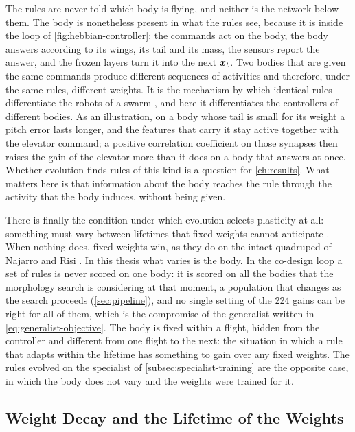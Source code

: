 The rules are never told which body is flying, and neither is the network below them. The body is nonetheless present in what the rules see, because it is inside the loop of \autoref{fig:hebbian-controller}: the commands act on the body, the body answers according to its wings, its tail and its mass, the sensors report the answer, and the frozen layers turn it into the next $\bm{x}_t$. Two bodies that are given the same commands produce different sequences of activities and therefore, under the same rules, different weights. It is the mechanism by which identical rules differentiate the robots of a swarm \cite{vandiggelen2025emergent}, and here it differentiates the controllers of different bodies. As an illustration, on a body whose tail is small for its weight a pitch error lasts longer, and the features that carry it stay active together with the elevator command; a positive correlation coefficient on those synapses then raises the gain of the elevator more than it does on a body that answers at once. Whether evolution finds rules of this kind is a question for \autoref{ch:results}. What matters here is that information about the body reaches the rule through the activity that the body induces, without being given.

There is finally the condition under which evolution selects plasticity at all: something must vary between lifetimes that fixed weights cannot anticipate \cite{soltoggio2018born}. When nothing does, fixed weights win, as they do on the intact quadruped of Najarro and Risi \cite{najarro2020meta}. In this thesis what varies is the body. In the co-design loop a set of rules is never scored on one body: it is scored on all the bodies that the morphology search is considering at that moment, a population that changes as the search proceeds (\autoref{sec:pipeline}), and no single setting of the 224 gains can be right for all of them, which is the compromise of the generalist written in \eqref{eq:generalist-objective}. The body is fixed within a flight, hidden from the controller and different from one flight to the next: the situation in which a rule that adapts within the lifetime has something to gain over any fixed weights. The rules evolved on the specialist of \autoref{subsec:specialist-training} are the opposite case, in which the body does not vary and the weights were trained for it.

\subsection{Weight Decay and the Lifetime of the Weights}
\label{subsec:hebbian-decay}

